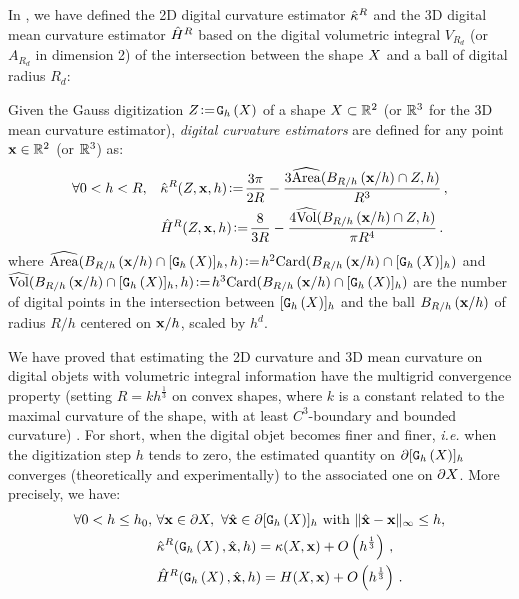 \documentclass{llncs}
\newcommand{\ie}{\emph{i.e.} }
\begin{document}
In \cite{DGCI2013}, we have defined the 2D digital curvature estimator
$\hat{\kappa}^{R}$ and the 3D digital mean curvature estimator $\hat{H}^{R}$ based on
the digital volumetric integral $V_{R_d}$ (or $A_{R_d}$ in dimension 2) of the
intersection between the shape $X$ and a ball of digital radius $R_d$:
%
\begin{Definition}
  Given the Gauss digitization $Z\!\mathrel{\mathop:}=\!\mathtt{G}_{h}\left(X\right)$ of a shape $X \subset {\mathbb{R}}^2$
  (or ${\mathbb{R}}^3$ for the 3D mean curvature estimator), {\em digital curvature estimators} are defined for any point $\mathbf{x}
  \in {\mathbb{R}}^2$ (or ${\mathbb{R}}^3$) as:
  \begin{align}
    \forall 0 < h < R,\quad
    &\hat{\kappa}^{R}(Z,\mathbf{x},h) \!\mathrel{\mathop:}=\! \frac{3\pi}{2R}
    - \frac{3\widehat{\mathrm{Area}}(B_{R/h}\left(\mathbf{x}/h\right) \cap
    {Z}, h)}{R^3}\,,\label{eq:dig-curvature-estimator-k}\\
    &\hat{H}^{R}(Z,\mathbf{x},h) \!\mathrel{\mathop:}=\! \frac{8}{3R}
    - \frac{4\widehat{\mathrm{Vol}}(B_{R/h}\left(\mathbf{x}/h\right) \cap
    Z, h)}{\pi R^4}\,.\label{eq:dig-curvature-estimator-H}
  \end{align}
  where $\widehat{\mathrm{Area}}(B_{R/h}\left(\mathbf{x}/h\right) \cap \lbrack \mathtt{G}_{h}\left(X\right) \rbrack_{h}, h) \!\mathrel{\mathop:}=\! h^2 \mathrm{Card}(
  B_{R/h}\left(\mathbf{x}/h\right) \cap \lbrack \mathtt{G}_{h}\left(X\right) \rbrack_{h} )$ and $\widehat{\mathrm{Vol}}(B_{R/h}\left(\mathbf{x}/h\right) \cap
  \lbrack \mathtt{G}_{h}\left(X\right) \rbrack_{h}, h) \!\mathrel{\mathop:}=\! h^3 \mathrm{Card}( B_{R/h}\left(\mathbf{x}/h\right) \cap \lbrack \mathtt{G}_{h}\left(X\right) \rbrack_{h} )$ are
  the number of digital points in the intersection between $\lbrack \mathtt{G}_{h}\left(X\right) \rbrack_{h}$ and
  the ball $B_{R/h}\left(\mathbf{x}/h\right)$ of radius $R/h$ centered on $\mathbf{x}/h$, scaled by
  $h^d$.
\end{Definition}
%
We have proved that estimating the 2D curvature and 3D mean curvature on digital
objets with volumetric integral information have the multigrid convergence
property (setting $R = kh^\frac{1}{3}$ on convex shapes, where $k$ is a constant
related to the maximal curvature of the shape, with at least $C^3$-boundary and
bounded curvature) \cite{DGCI2013}. For short, when the digital objet becomes
finer and finer, \ie when the digitization step $h$ tends to zero, the estimated
quantity on $\partial \lbrack \mathtt{G}_{h}\left(X\right) \rbrack_{h}$  converges (theoretically and experimentally)
to the associated one on $\partial X$. More precisely, we have:
%
\begin{align}
\forall 0 < h \le h_0,\,\, &\forall \mathbf{x} \in \partial X,\,\,
\forall \hat{\mathbf{x}} \in \partial \lbrack \mathtt{G}_{h}\left(X\right) \rbrack_{h} \text{~with~} \| \hat{\mathbf{x}} -\mathbf{x}\|_\infty \le h, \nonumber \\
&\hat{\kappa}^{R}(\mathtt{G}_{h}\left(X\right), \hat{\mathbf{x}}, h) = \kappa(X, \mathbf{x}) + O\left(h^{\frac{1}{3}}\right)\,,\\
&\hat{H}^{R}(\mathtt{G}_{h}\left(X\right), \hat{\mathbf{x}}, h) = H(X, \mathbf{x}) + O\left(h^{\frac{1}{3}}\right)\,.
\end{align}
\end{document}
